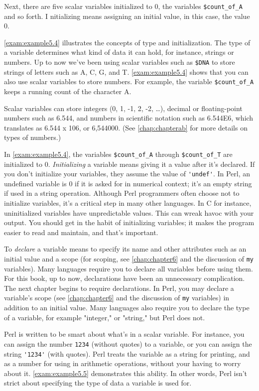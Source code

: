 Next, there are five scalar variables initialized to 0, the variables \verb|$count_of_A| and so forth. I nitializing means assigning an initial value, in this case, the value 0. 

\autoref{exam:example5.4} illustrates the concepts of type and initialization. The type of a variable determines what kind of data it can hold, for instance, strings or numbers. Up to now we've been using scalar variables such as \verb|$DNA| to store strings of letters such as A, C, G, and T. \autoref{exam:example5.4} shows that you can also use scalar variables to store numbers. For example, the variable \verb|$count_of_A| keeps a running count of the character A.

Scalar variables can store integers (0, 1, -1, 2, -2, \ldots), decimal or floating-point numbers such as 6.544, and numbers in scientific notation such as 6.544E6, which translates as 6.544 x 106, or 6,544000.  (See \autoref{chap:chapterab} for more details on types of numbers.)

In \autoref{exam:example5.4}, the variables \verb|$count_of_A| through \verb|$count_of_T| are initialized to 0. \textit{Initializing} a variable means giving it a value after it's declared. If you don't initialize your variables, they assume the value of \verb|'undef'|. In Perl, an undefined variable is 0 if it is asked for in numerical context; it's an empty string if used in a string operation. Although Perl programmers often choose not to initialize variables, it's a critical step in many other languages. In C for instance, uninitialized variables have unpredictable values. This can wreak havoc with your output. You should get in the habit of initializing variables; it makes the program easier to read and maintain, and that's important.

To \textit{declare} a variable means to specify its name and other attributes such as an initial value and a scope (for scoping, see \autoref{chap:chapter6} and the discussion of \verb|my| variables). Many languages require you to declare all variables before using them. For this book, up to now, declarations have been an unnecessary complication. The next chapter begins to require declarations. In Perl, you may declare a variable's scope (see \autoref{chap:chapter6} and the discussion of \verb|my| variables) in addition to an initial value.  Many languages also require you to declare the type of a variable, for example "integer," or "string," but Perl does not.

Perl is written to be smart about what's in a scalar variable. For instance, you can assign the number \verb|1234| (without quotes) to a variable, or you can assign the string \verb|'1234'| (with quotes). Perl treats the variable as a string for printing, and as a number for using in arithmetic operations, without your having to worry about it. \autoref{exam:example5.5} demonstrates this ability. In other words, Perl isn't strict about specifying the type of data a variable is used for. 

